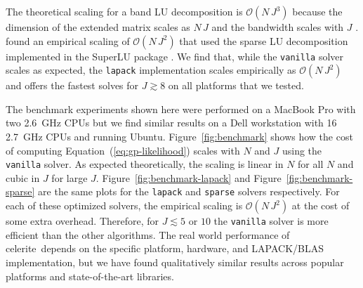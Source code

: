 \documentclass[manuscript, letterpaper]{aastex6}
\newcommand{\project}[1]{\textsf{#1}}
\newcommand{\celerite}{\project{celerite}}
\newcommand{\figureref}[1]{\ref{fig:#1}}
\newcommand{\Figure}[1]{Figure~\figureref{#1}}
\renewcommand{\eqref}[1]{\ref{eq:#1}}
\newcommand{\Eq}[1]{Equation~(\eqref{#1})}
\newcommand{\eq}[1]{\Eq{#1}}
\begin{document}
The theoretical scaling for a band LU decomposition is $\mathcal{O}(N\,J^3)$
because the dimension of the extended matrix scales as $N\,J$ and the
bandwidth scales with $J$ \citep{Press:1992, Press:2007}.
\citet{Ambikasaran:2015} found an empirical scaling of $\mathcal{O}(N\,J^2)$ that used the sparse LU decomposition implemented in the
\project{SuperLU} package \citep{Demmel:1999}.
We find that, while the \texttt{vanilla} solver scales as expected, the
\texttt{lapack} implementation scales empirically as $\mathcal{O}(N\,J^2)$ and
offers the fastest solves for $J \gtrsim 8$ on all platforms that we tested.

The benchmark experiments shown here were performed on a MacBook Pro with two
2.6~GHz CPUs but we find similar results on a Dell workstation with 16 2.7~GHz
CPUs and running Ubuntu.
\Figure{benchmark} shows how the cost of computing \eq{gp-likelihood} scales
with $N$ and $J$ using the \texttt{vanilla} solver.
As expected theoretically, the scaling is linear in $N$ for all $N$ and cubic
in $J$ for large $J$.
\Figure{benchmark-lapack} and \Figure{benchmark-sparse} are the same plots for
the \texttt{lapack} and \texttt{sparse} solvers respectively.
For each of these optimized solvers, the empirical scaling is
$\mathcal{O}(N\,J^2)$ at the cost of some extra overhead.
Therefore, for $J \lesssim 5$ or $10$ the \texttt{vanilla} solver is more
efficient than the other algorithms.
The real world performance of \celerite\ depends on the specific platform,
hardware, and \project{LAPACK}/\project{BLAS} implementation, but we have
found qualitatively similar results across popular platforms and
state-of-the-art libraries.
\end{document}
